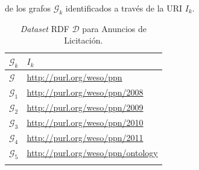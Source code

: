 de los grafos $\mathcal{G}_k$ identificados a través de la URI $I_k$.
% 
\begin{longtable}[c]{|p{3cm}|p{9cm}|} 
\hline
  \textbf{$\mathcal{G}_k$} &  \textbf{$I_k$}  \\\hline
\endhead
 \textbf{$\mathcal{G}$}   & \url{http://purl.org/weso/ppn} \\ \hline
 \textbf{$\mathcal{G}_1$} & \url{http://purl.org/weso/ppn/2008} \\ \hline
 \textbf{$\mathcal{G}_2$} & \url{http://purl.org/weso/ppn/2009} \\ \hline
 \textbf{$\mathcal{G}_3$} & \url{http://purl.org/weso/ppn/2010} \\ \hline
 \textbf{$\mathcal{G}_4$} & \url{http://purl.org/weso/ppn/2011} \\ \hline
 \textbf{$\mathcal{G}_{5}$} & \url{http://purl.org/weso/ppn/ontology} \\ \hline 
\hline
\caption{\textit{Dataset} RDF $\mathcal{D}$ para Anuncios de Licitación.}\label{table:ppn-dataset}\\    
\end{longtable}
% 
% 
